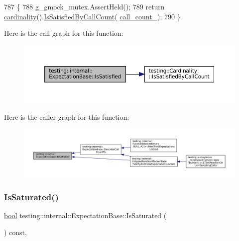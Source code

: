 \begin{DoxyCode}
787                                                     \{
788     g\_gmock\_mutex.AssertHeld();
789     \textcolor{keywordflow}{return} \hyperlink{classtesting_1_1internal_1_1ExpectationBase_a1399efffbc8675510a15c6ba1f18184b}{cardinality}().\hyperlink{classtesting_1_1Cardinality_a6c5e2bd2887ff06e20e6fcc4255a0c1c}{IsSatisfiedByCallCount}(
      \hyperlink{classtesting_1_1internal_1_1ExpectationBase_aea95d46f7583566e3f7a081b0668ad4c}{call\_count\_});
790   \}
\end{DoxyCode}
Here is the call graph for this function\+:
\nopagebreak
\begin{figure}[H]
\begin{center}
\leavevmode
\includegraphics[width=350pt]{classtesting_1_1internal_1_1ExpectationBase_ae629adc2dd9aee0ac62e50314f1a6449_cgraph}
\end{center}
\end{figure}
Here is the caller graph for this function\+:
\nopagebreak
\begin{figure}[H]
\begin{center}
\leavevmode
\includegraphics[width=350pt]{classtesting_1_1internal_1_1ExpectationBase_ae629adc2dd9aee0ac62e50314f1a6449_icgraph}
\end{center}
\end{figure}
\mbox{\label{classtesting_1_1internal_1_1ExpectationBase_ad3e4340cedefdc24fce1478a8d6cab93}} 
\subsubsection{\texorpdfstring{Is\+Saturated()}{IsSaturated()}}
{\footnotesize\ttfamily \hyperlink{classbool}{bool} testing\+::internal\+::\+Expectation\+Base\+::\+Is\+Saturated (\begin{DoxyParamCaption}{ }\end{DoxyParamCaption}) const\hspace{0.3cm}{\ttfamily [inline]}, {\ttfamily [protected]}}



